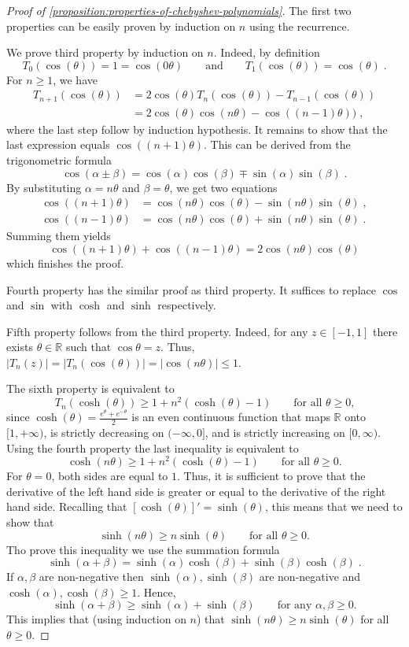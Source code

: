 \documentclass[12pt]{article}
\newcommand{\R}{\mathbb{R}}  %
\begin{document}
\begin{proof}[Proof of \autoref{proposition:properties-of-chebyshev-polynomials}]
The first two properties can be easily proven by induction on $n$ using the recurrence.

We prove third property by induction on $n$. Indeed, by definition
$$
T_0(\cos(\theta)) = 1 = \cos(0 \theta) \qquad \text{and} \qquad T_1(\cos(\theta)) = \cos(\theta) \; .
$$
For $n \ge 1$, we have
\begin{align*}
T_{n+1}(\cos(\theta))
& = 2 \cos(\theta) T_n(\cos(\theta)) - T_{n-1}(\cos(\theta)) \\
& = 2 \cos(\theta) \cos(n \theta) - \cos((n-1)\theta)) \; ,
\end{align*}
where the last step follow by induction hypothesis.
It remains to show that the last expression equals $\cos((n+1)\theta)$.
This can be derived from the trigonometric formula
$$
\cos(\alpha \pm \beta) = \cos(\alpha) \cos(\beta) \mp \sin(\alpha) \sin(\beta) \; .
$$
By substituting $\alpha = n \theta$ and $\beta = \theta$, we get two equations
\begin{align*}
\cos((n+1) \theta) & = \cos(n \theta) \cos(\theta) - \sin(n \theta) \sin(\theta) \; , \\
\cos((n-1) \theta) & = \cos(n \theta) \cos(\theta) + \sin(n \theta) \sin(\theta) \; .
\end{align*}
Summing them yields
$$
\cos((n+1)\theta) + \cos((n-1) \theta) = 2 \cos(n \theta) \cos(\theta)
$$
which finishes the proof.

Fourth property has the similar proof as third property. It suffices
to replace $\cos$ and $\sin$ with $\cosh$ and $\sinh$ respectively.

Fifth property follows from the third property. Indeed, for any $z \in [-1,1]$
there exists $\theta \in \R$ such that $\cos \theta = z$. Thus, $|T_n(z)| =
|T_n(\cos(\theta))| = |\cos(n\theta)| \le 1$.

The sixth property is equivalent to
$$
T_n(\cosh(\theta)) \ge 1 + n^2 (\cosh(\theta) - 1) \qquad \text{for all $\theta \ge 0$,}
$$
since $\cosh(\theta) = \frac{e^{\theta} + e^{-\theta}}{2}$ is an even continuous
function that maps $\R$ onto $[1,+\infty)$, is strictly decreasing on
$(-\infty,0]$, and is strictly increasing on $[0,\infty)$. Using the fourth
property the last inequality is equivalent to
$$
\cosh(n \theta) \ge 1 + n^2 (\cosh(\theta) - 1) \qquad \text{for all $\theta \ge 0$.}
$$
For $\theta = 0$, both sides are equal to $1$. Thus, it is sufficient to prove
that the derivative of the left hand side is greater or equal to the derivative
of the right hand side. Recalling that $[\cosh(\theta)]' = \sinh(\theta)$, this
means that we need to show that
$$
\sinh(n \theta) \ge n \sinh(\theta) \qquad \text{for all $\theta \ge 0$.}
$$
Tho prove this inequality we use the summation formula
$$
\sinh(\alpha + \beta) = \sinh(\alpha) \cosh(\beta) + \sinh(\beta) \cosh(\beta) \; .
$$
If $\alpha, \beta$ are non-negative then $\sinh(\alpha), \sinh(\beta)$ are
non-negative and $\cosh(\alpha), \cosh(\beta) \ge 1$. Hence,
$$
\sinh(\alpha + \beta) \ge \sinh(\alpha) + \sinh(\beta) \qquad \text{for any $\alpha, \beta \ge 0$.}
$$
This implies that (using induction on $n$) that $\sinh(n \theta) \ge n
\sinh(\theta)$ for all $\theta \ge 0$.


\end{proof}
\end{document}
